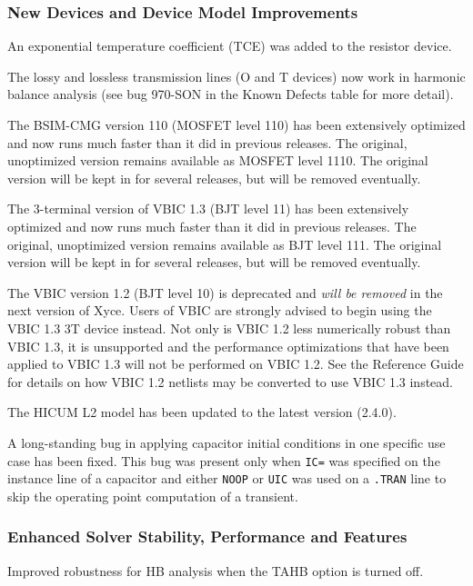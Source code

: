 \documentclass{article}
\begin{document}
\subsubsection*{New Devices and Device Model Improvements}
\begin{XyceItemize}
\item An exponential temperature coefficient (TCE) was added to
  the resistor device.
\item The lossy and lossless transmission lines (O and T devices) now
  work in harmonic balance analysis (see bug 970-SON in the Known
  Defects table for more detail).
\item The BSIM-CMG version 110 (MOSFET level 110) has been extensively
  optimized and now runs much faster than it did in previous releases.
  The original, unoptimized version remains available as MOSFET level
  1110.  The original version will be kept in \Xyce{} for several
  releases, but will be removed eventually.
\item The 3-terminal version of VBIC 1.3 (BJT level 11) has been
  extensively optimized and now runs much faster than it did in
  previous releases.  The original, unoptimized version remains
  available as BJT level 111.  The original version will be kept in
  \Xyce{} for several releases, but will be removed eventually.
\item The VBIC version 1.2 (BJT level 10) is deprecated and {\em will
  be removed\/} in the next version of Xyce.  Users of VBIC are
  strongly advised to begin using the VBIC 1.3 3T device instead.
  Not only is VBIC 1.2 less numerically robust than VBIC 1.3, it is
  unsupported and the performance optimizations that have been
  applied to VBIC 1.3 will not be performed on VBIC 1.2.  See the
  \Xyce{} Reference Guide for details on how VBIC 1.2 netlists may
  be converted to use VBIC 1.3 instead.
\item The HICUM L2 model has been updated to the latest version (2.4.0).
\item A long-standing bug in applying capacitor initial conditions in
  one specific use case has been fixed.  This bug was present only when
  \texttt{IC=} was specified on the instance line of a capacitor and either
  \texttt{NOOP} or \texttt{UIC} was used on a \texttt{.TRAN} line to
  skip the operating point computation of a transient.
\end{XyceItemize}

\subsubsection*{Enhanced Solver Stability, Performance and Features}
\begin{XyceItemize}
\item Improved robustness for HB analysis when the TAHB option is turned off.
\end{XyceItemize}
\end{document}
